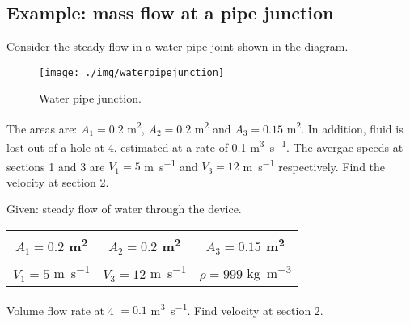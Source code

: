 \subsection{Example: mass flow at a pipe junction}
Consider the steady flow in a water pipe joint shown in the diagram.
\begin{figure}[h]
  \centering
  \texttt{[image: ./img/waterpipejunction]}
  \caption{Water pipe junction.}
\end{figure}
The areas are: $A_1 = 0.2$ \si{\meter\squared}, $A_2 = 0.2$ \si{\meter\squared} and $A_3 = 0.15$ \si{\meter\squared}. In addition, fluid is lost out of a hole at 4, estimated at a rate of 0.1 \si{\meter\cubed\per\second}. The avergae speeds at sections 1 and 3 are $V_1 = 5$ \si{\meter\per\second} and $V_3 = 12$ \si{\meter\per\second} respectively. Find the velocity at section 2.

Given: steady flow of water through the device.
\begin{center}
  \begin{tabular}{|c|c|c|}
    \hline
    $A_1 = 0.2$ \si{\meter\squared}  & $A_2 = 0.2$ \si{\meter\squared}   & $A_3 = 0.15$ \si{\meter\squared}      \\
    \hline
    $V_1 = 5$ \si{\meter\per\second} & $V_3 = 12$ \si{\meter\per\second} & $\rho = 999$ \si{\kg\per\meter\cubed} \\
    \hline
  \end{tabular}
\end{center}
Volume flow rate at 4 $=0.1$ \si{\meter\cubed\per\second}. Find velocity at section 2.

